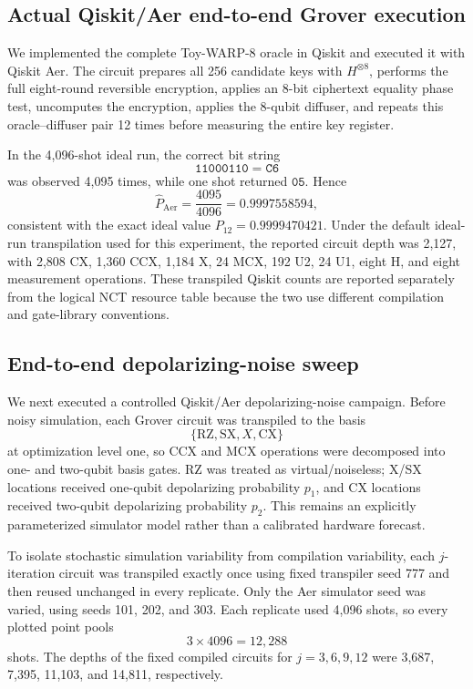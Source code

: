 \documentclass[10pt,a4paper]{article}
\begin{document}
\subsection{Actual Qiskit/Aer end-to-end Grover execution}
\label{subsec:toywarp_qiskit}
We implemented the complete Toy-WARP-8 oracle in Qiskit and executed it with Qiskit Aer.  The circuit prepares all 256 candidate keys with $H^{\otimes 8}$, performs the full eight-round reversible encryption, applies an 8-bit ciphertext equality phase test, uncomputes the encryption, applies the 8-qubit diffuser, and repeats this oracle--diffuser pair 12 times before measuring the entire key register.

In the 4,096-shot ideal run, the correct bit string
\begin{equation}
    \mathtt{11000110}=\mathtt{C6}
\end{equation}
was observed 4,095 times, while one shot returned $\mathtt{05}$.  Hence
\begin{equation}
    \widehat P_{\mathrm{Aer}}=\frac{4095}{4096}=0.9997558594,
\end{equation}
consistent with the exact ideal value $P_{12}=0.9999470421$.  Under the default ideal-run transpilation used for this experiment, the reported circuit depth was 2,127, with 2,808 CX, 1,360 CCX, 1,184 X, 24 MCX, 192 U2, 24 U1, eight H, and eight measurement operations.  These transpiled Qiskit counts are reported separately from the logical NCT resource table because the two use different compilation and gate-library conventions.

\subsection{End-to-end depolarizing-noise sweep}
\label{subsec:toywarp_noise}
We next executed a controlled Qiskit/Aer depolarizing-noise campaign. Before noisy simulation, each Grover circuit was transpiled to the basis
\[
    \{\mathrm{RZ},\mathrm{SX},X,\mathrm{CX}\}
\]
at optimization level one, so CCX and MCX operations were decomposed into one- and two-qubit basis gates. RZ was treated as virtual/noiseless; X/SX locations received one-qubit depolarizing probability $p_1$, and CX locations received two-qubit depolarizing probability $p_2$. This remains an explicitly parameterized simulator model rather than a calibrated hardware forecast.

To isolate stochastic simulation variability from compilation variability, each $j$-iteration circuit was transpiled exactly once using fixed transpiler seed 777 and then reused unchanged in every replicate. Only the Aer simulator seed was varied, using seeds 101, 202, and 303. Each replicate used 4,096 shots, so every plotted point pools
\[
    3\times4096=12{,}288
\]
shots. The depths of the fixed compiled circuits for $j=3,6,9,12$ were 3,687, 7,395, 11,103, and 14,811, respectively.
\end{document}
